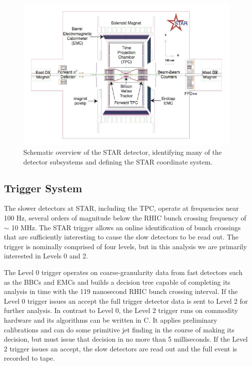 \begin{figure}
  \includegraphics[width=1.0\textwidth]{figures/star-schematic}
  \caption{Schematic overview of the STAR detector, identifying many of the detector subsystems and defining the STAR coordinate system.}
  \label{fig:star-schematic}
\end{figure}

\subsection{Trigger System}

The slower detectors at STAR, including the TPC, operate at frequencies near 100 Hz, several orders of magnitude below the RHIC bunch crossing frequency of $\sim$ 10 MHz.  The STAR trigger \cite{Bieser:2002ah} allows an online identification of bunch crossings that are sufficiently interesting to cause the slow detectors to be read out.  The trigger is nominally comprised of four levels, but in this analysis we are primarily interested in Levels 0 and 2.

The Level 0 trigger operates on coarse-granularity data from fast detectors such as the BBCs and EMCs and builds a decision tree capable of completing its analysis in time with the 119 nanosecond RHIC bunch crossing interval.  If the Level 0 trigger issues an accept the full trigger detector data is sent to Level 2 for further analysis.  In contrast to Level 0, the Level 2 trigger runs on commodity hardware and its algorithms can be written in C.  It applies preliminary calibrations and can do some primitive jet finding in the course of making its decision, but must issue that decision in no more than 5 milliseconds.  If the Level 2 trigger issues an accept, the slow detectors are read out and the full event is recorded to tape.


